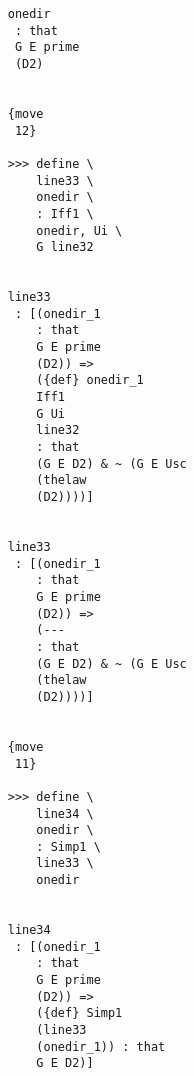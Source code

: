 \documentclass[12pt]{article}
\begin{document}
\begin{verbatim}
                                    onedir 
                                     : that 
                                     G E prime 
                                     (D2)


                                    {move 
                                     12}

                                    >>> define \
                                        line33 \
                                        onedir \
                                        : Iff1 \
                                        onedir, Ui \
                                        G line32


                                    line33 
                                     : [(onedir_1 
                                        : that 
                                        G E prime 
                                        (D2)) => 
                                        ({def} onedir_1 
                                        Iff1 
                                        G Ui 
                                        line32 
                                        : that 
                                        (G E D2) & ~ (G E Usc 
                                        (thelaw 
                                        (D2))))]


                                    line33 
                                     : [(onedir_1 
                                        : that 
                                        G E prime 
                                        (D2)) => 
                                        (--- 
                                        : that 
                                        (G E D2) & ~ (G E Usc 
                                        (thelaw 
                                        (D2))))]


                                    {move 
                                     11}

                                    >>> define \
                                        line34 \
                                        onedir \
                                        : Simp1 \
                                        line33 \
                                        onedir


                                    line34 
                                     : [(onedir_1 
                                        : that 
                                        G E prime 
                                        (D2)) => 
                                        ({def} Simp1 
                                        (line33 
                                        (onedir_1)) : that 
                                        G E D2)]



\end{verbatim}
\end{document}
